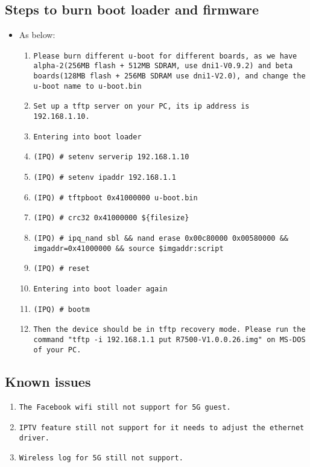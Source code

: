 \documentclass[12pt]{report}
\begin{document}
    \subsection{Steps to burn boot loader and firmware}
    \begin{itemize}
    \item As below:
            \begin{enumerate}
	    	\item \texttt{Please burn different u-boot for different boards, as we have alpha-2(256MB flash + 512MB SDRAM, use dni1-V0.9.2) and beta boards(128MB flash + 256MB SDRAM use dni1-V2.0), and change the u-boot name to u-boot.bin}
		\item \texttt{Set up a tftp server on your PC, its ip address is 192.168.1.10.}
		\item \texttt{Entering into boot loader}
		\item \texttt{(IPQ) \# setenv serverip 192.168.1.10}
		\item \texttt{(IPQ) \# setenv ipaddr 192.168.1.1}
		\item \texttt{(IPQ) \# tftpboot 0x41000000 u-boot.bin}
		\item \texttt{(IPQ) \# crc32 0x41000000 \$\{filesize\}}
		\item \texttt{(IPQ) \# ipq\_nand sbl \&\& nand erase 0x00c80000 0x00580000 \&\& imgaddr=0x41000000 \&\& source \$imgaddr:script}
		\item \texttt{(IPQ) \# reset}
		\item \texttt{Entering into boot loader again}
		\item \texttt{(IPQ) \# bootm}
		\item \texttt{Then the device should be in tftp recovery mode. Please run the command "tftp -i 192.168.1.1 put R7500-V1.0.0.26.img" on MS-DOS of your PC.}
            \end{enumerate}
    \end{itemize}

\subsection{Known issues}
            \begin{enumerate}
		\item \texttt{The Facebook wifi still not support for 5G guest.}
		\item \texttt{IPTV feature still not support for it needs to adjust the ethernet driver.}
		\item \texttt{Wireless log for 5G still not support.}
            \end{enumerate}
\end{document}
